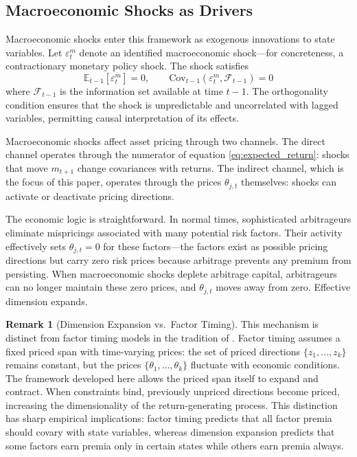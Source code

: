 \documentclass[12pt,letterpaper]{article}
\theoremstyle{plain}
\theoremstyle{definition}
\newtheorem{remark}{Remark}
\newcommand{\E}{\mathbb{E}}
\newcommand{\Cov}{\mathrm{Cov}}
\newcommand{\SDF}{m}
\begin{document}
\subsection{Macroeconomic Shocks as Drivers}\label{subsec:shocks}

Macroeconomic shocks enter this framework as exogenous innovations to state variables. Let $\varepsilon_t^m$ denote an identified macroeconomic shock---for concreteness, a contractionary monetary policy shock. The shock satisfies
\begin{equation}\label{eq:shock_orthogonality}
\E_{t-1}[\varepsilon_t^m] = 0, \qquad \Cov_{t-1}(\varepsilon_t^m, \mathcal{F}_{t-1}) = 0
\end{equation}
where $\mathcal{F}_{t-1}$ is the information set available at time $t-1$. The orthogonality condition ensures that the shock is unpredictable and uncorrelated with lagged variables, permitting causal interpretation of its effects.

Macroeconomic shocks affect asset pricing through two channels. The direct channel operates through the numerator of equation \eqref{eq:expected_return}: shocks that move $\SDF_{t+1}$ change covariances with returns. The indirect channel, which is the focus of this paper, operates through the prices $\theta_{j,t}$ themselves: shocks can activate or deactivate pricing directions.

The economic logic is straightforward. In normal times, sophisticated arbitrageurs eliminate mispricings associated with many potential risk factors. Their activity effectively sets $\theta_{j,t} = 0$ for these factors---the factors exist as possible pricing directions but carry zero risk prices because arbitrage prevents any premium from persisting. When macroeconomic shocks deplete arbitrage capital, arbitrageurs can no longer maintain these zero prices, and $\theta_{j,t}$ moves away from zero. Effective dimension expands.

\begin{remark}[Dimension Expansion vs.\ Factor Timing]\label{rem:factor_timing}
This mechanism is distinct from factor timing models in the tradition of \cite{cochrane2011presidential}. Factor timing assumes a fixed priced span with time-varying prices: the set of priced directions $\{z_1, \ldots, z_k\}$ remains constant, but the prices $\{\theta_1, \ldots, \theta_k\}$ fluctuate with economic conditions. The framework developed here allows the priced span itself to expand and contract. When constraints bind, previously unpriced directions become priced, increasing the dimensionality of the return-generating process. This distinction has sharp empirical implications: factor timing predicts that all factor premia should covary with state variables, whereas dimension expansion predicts that some factors earn premia only in certain states while others earn premia always.
\end{remark}
\end{document}
